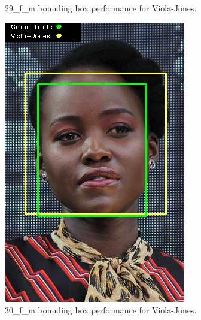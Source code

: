\documentclass{l4proj}
\begin{document}
\begin{appendices}
\begin{figure}[h!]
\begin{minipage}{0.49\textwidth}
    \caption{29\_f\_m bounding box performance for Viola-Jones.}
    \label{whoopi_result}
  \end{minipage}
\end{figure}

\begin{figure}[h!]
  \centering
  \begin{minipage}{0.49\textwidth}
    \centering
     \includegraphics[width=\textwidth]{images/appendix/viola/30.png}
    \caption{30\_f\_m bounding box performance for Viola-Jones.}
    \label{whoopi_result}
  \end{minipage}
    \hfill
    \begin{minipage}{0.49\textwidth}
    \centering

\end{minipage}
\end{figure}
\end{appendices}
\end{document}
